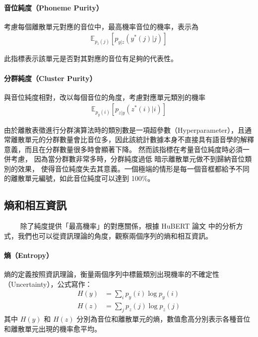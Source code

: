 \paragraph{音位純度（Phoneme Purity）}

考慮每個離散單元對應的音位中，最高機率音位的機率，表示為
\begin{align}
    \mathbb{E}_{p_z(j)}\left[p_{y|z}(y^*(j)|j) \right]
\end{align}

此指標表示該單元是否對其對應的音位有足夠的代表性。

\paragraph{分群純度（Cluster Purity）}

與音位純度相對，改以每個音位的角度，考慮對應單元類別的機率
\begin{align}
    \mathbb{E}_{p_y(i)}\left[p_{z|y}(z^*(i)|i) \right]
\end{align}

由於離散表徵進行分群演算法時的類別數是一項超參數（Hyperparameter），且通常離散單元的分群數量會比音位多，因此該統計數據本身不直接具有語音學的解釋意義，而且在分群數量很多時會顯著下降。
然而該指標在考量音位純度時必須一併考慮，
因為當分群數非常多時，分群純度過低
暗示離散單元做不到歸納音位類別的效果，
使得音位純度失去其意義。一個極端的情形是每一個音框都給予不同的離散單元編號，如此音位純度可以達到
100\%。

\subsection{熵和相互資訊}
　　
除了純度提供「最高機率」的對應關係，根據 HuBERT 論文 \cite{hsu_hubert_2021-2} 中的分析方式，我們也可以從資訊理論的角度，觀察兩個序列的熵和相互資訊。

\paragraph{熵（Entropy）}

熵的定義按照資訊理論，衡量兩個序列中標籤類別出現機率的不確定性（Uncertainty），公式寫作：
\begin{align}
    H(y) & = \sum_i{p_y(i)\log p_y(i)} \\
    H(z) & = \sum_j{p_z(j)\log p_z(j)}
\end{align}
其中 $H(y)$ 和 $H(z)$ 分別為音位和離散單元的熵，數值愈高分別表示各種音位和離散單元出現的機率愈平均。

